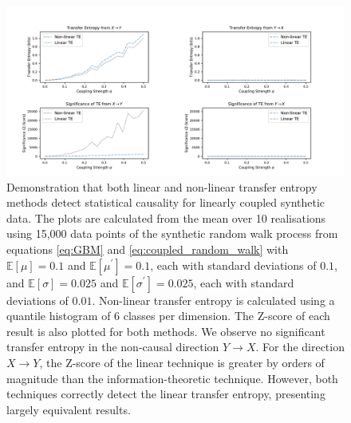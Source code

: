 \documentclass[]{rsos}%
\begin{document}
  \begin{figure}[!htb]
    \includegraphics[width=\linewidth]{images/confirming_gbm.pdf}
    \caption{Demonstration that both linear and non-linear transfer entropy methods detect statistical causality for linearly coupled synthetic data. The plots are calculated from the mean over 10 realisations using 15,000 data points of the synthetic random walk process from equations \ref{eq:GBM} and \ref{eq:coupled_random_walk} with $\mathbb{E} [\mu]=0.1$ and $\mathbb{E} [\mu^{\prime}]=0.1$, each with standard deviations of $0.1$, and $\mathbb{E} [\sigma]=0.025$ and $\mathbb{E} [\sigma^{\prime}]=0.025$, each with standard deviations of $0.01$.
    Non-linear transfer entropy is calculated using a quantile histogram of 6 classes per dimension. The Z-score of each result is also plotted for both methods. We observe no significant transfer entropy in the non-causal direction $Y \rightarrow X$. For the direction $X \rightarrow Y$, the Z-score of the linear technique is greater by orders of magnitude than the information-theoretic technique. However, both techniques correctly detect the linear transfer entropy, presenting largely equivalent results.}
    \label{fig:GBM_confirmation}


\end{figure}
\end{document}
